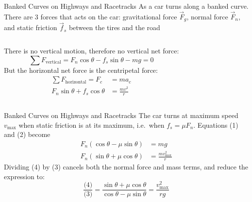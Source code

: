 \documentclass[12pt,compress,aspectratio=169]{beamer}
\begin{document}
\begin{frame}{Banked Curves on Highways and Racetracks}
  As a car turns along a banked curve. There are 3 forces that acts on the
  car: gravitational force $\vec F_g$, normal force $\vec F_n$, and static
  friction $\vec f_s$ between the tires and the road

  \vspace{.1in}
  \begin{columns}
  
    There is no vertical motion, therefore no vertical net force:
    \begin{equation}
      \sum F_\text{vertical}= F_n\cos\theta-f_s\sin\theta-mg=0
    \end{equation}
    But the horizontal net force is the centripetal force:
    \begin{align}
      \nonumber
      \sum F_\text{horizontal}=F_c&=ma_c\\
      F_n\sin\theta +f_s\cos\theta &= \frac{mv^2}r
    \end{align}
  \end{columns}
\end{frame}


\begin{frame}{Banked Curves on Highways and Racetracks}
  The car turns at maximum speed $v_\text{max}$ when static friction is at its
  maximum, i.e.\ when $f_s=\mu F_n$. Equations (1) and (2) become
  \begin{align}
    F_n\left(\cos\theta-\mu\sin\theta\right) &=mg\\
    F_n\left(\sin\theta+\mu\cos\theta\right) &=\frac{mv_\text{max}^2}r
  \end{align}
  Dividing (4) by (3) cancels both the normal force and mass terms, and reduce
  the expression to:
  \begin{equation*}
    \frac{\text{(4)}}{\text{(3)}}=
  \frac{\sin\theta+\mu\cos\theta}{\cos\theta-\mu\sin\theta}
  =\frac{v_\text{max}^2}{rg}
  \end{equation*}
\end{frame}
\end{document}
